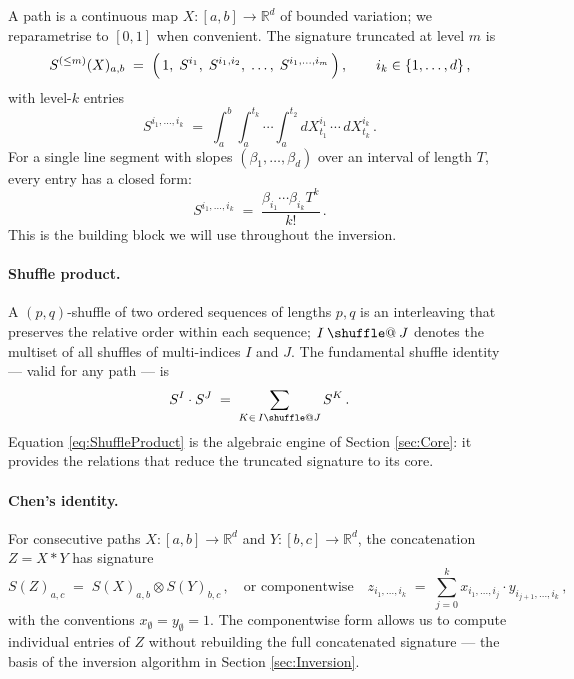 \documentclass[11pt,english]{article}
\makeatletter
\providecommand*{\shuffle}{\mathbin{\mathpalette\shuffle@{}}}
\newcommand*{\shuffle@}[2]{%
  \sbox0{$#1\vcenter{}$}%
  \kern .15\ht0
  \rlap{\vrule height .25\ht0 depth 0pt width 2.5\ht0}%
  \raise.1\ht0\hbox to 2.5\ht0{%
    \vrule height 1.75\ht0 depth -.1\ht0 width .17\ht0
    \hfill
    \vrule height 1.75\ht0 depth -.1\ht0 width .17\ht0
    \hfill
    \vrule height 1.75\ht0 depth -.1\ht0 width .17\ht0}%
  \kern .15\ht0
}
\makeatother
\begin{document}
A path is a continuous map $X:[a,b]\to\mathbb{R}^{d}$ of bounded variation;
we reparametrise to $[0,1]$ when convenient. The signature truncated
at level $m$ is
\begin{equation}
S^{(\leq m)}(X)_{a,b}\;=\;\Bigl(\,1,\;S^{i_{1}},\;S^{i_{1},i_{2}},\;\ldots,\;S^{i_{1},\ldots,i_{m}}\,\Bigr)\,,\qquad i_{k}\in\{1,\ldots,d\}\,,
\end{equation}
with level-$k$ entries
\begin{equation}
S^{i_{1},\ldots,i_{k}}\;=\;\int_{a}^{b}\int_{a}^{t_{k}}\cdots\int_{a}^{t_{2}}dX_{t_{1}}^{i_{1}}\,\cdots\,dX_{t_{k}}^{i_{k}}\,.\label{eq:IteratedIntegral}
\end{equation}
For a single line segment with slopes $(\beta_{1},\ldots,\beta_{d})$
over an interval of length $T$, every entry has a closed form:
\begin{equation}
S^{i_{1},\ldots,i_{k}}\;=\;\frac{\beta_{i_{1}}\cdots\beta_{i_{k}}T^{k}}{k!}\,.\label{eq:LineSignature}
\end{equation}
This is the building block we will use throughout the inversion.

\paragraph{Shuffle product.}
A $(p,q)$-shuffle of two ordered sequences of lengths $p,q$ is an
interleaving that preserves the relative order within each sequence;
$I\shuffle J$ denotes the multiset of all shuffles of multi-indices
$I$ and $J$. The fundamental shuffle identity --- valid for any
path --- is
\begin{equation}
S^{I}\cdot S^{J}\;=\;\sum_{K\in\,I\shuffle J}S^{K}\,.\label{eq:ShuffleProduct}
\end{equation}
Equation \eqref{eq:ShuffleProduct} is the algebraic engine of Section
\ref{sec:Core}: it provides the relations that reduce the truncated
signature to its core.

\paragraph{Chen's identity.}
For consecutive paths $X:[a,b]\to\mathbb{R}^{d}$ and $Y:[b,c]\to\mathbb{R}^{d}$,
the concatenation $Z=X*Y$ has signature
\begin{equation}
S(Z)_{a,c}\;=\;S(X)_{a,b}\otimes S(Y)_{b,c}\,,\quad\text{or componentwise}\quad z_{i_{1},\ldots,i_{k}}\;=\;\sum_{j=0}^{k}x_{i_{1},\ldots,i_{j}}\cdot y_{i_{j+1},\ldots,i_{k}}\,,\label{eq:ChenIndex}
\end{equation}
with the conventions $x_{\emptyset}=y_{\emptyset}=1$. The componentwise
form allows us to compute individual entries of $Z$ without rebuilding
the full concatenated signature --- the basis of the inversion algorithm
in Section \ref{sec:Inversion}.
\end{document}
